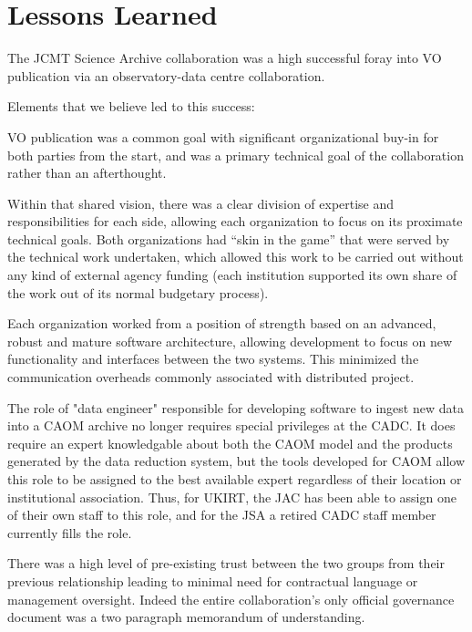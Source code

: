 \documentclass[final,authoryear,5p,times,twocolumn]{elsarticle}
\begin{document}
\section{Lessons Learned}

The JCMT Science Archive collaboration was a high successful foray
into VO publication via an observatory-data centre collaboration.

Elements that we believe led to this success:

\begin{itemize}
\item VO publication was a common goal with significant organizational
  buy-in for both parties from the start, and was a primary technical
  goal of the collaboration rather than an afterthought.

\item Within that shared vision, there was a clear division of
  expertise and responsibilities for each side, allowing each
  organization to focus on its proximate technical goals. Both
  organizations had ``skin in the game'' that were served by the
  technical work undertaken, which allowed this work to be carried out
  without any kind of external agency funding (each institution
  supported its own share of the work out of its normal budgetary
  process).

\item Each organization worked from a position of strength based on an
  advanced, robust and mature software architecture, allowing
  development to focus on new functionality and interfaces between the
  two systems. This minimized the communication overheads commonly
  associated with distributed project.

{\color{red}
\item The role of "data engineer" responsible for developing software to
ingest new data into a CAOM archive no longer requires special privileges
at the CADC.  It does require an expert
knowledgable about both the CAOM model and the products generated
by the data reduction system, but the tools developed for CAOM
allow this role to be assigned to the best available expert regardless of their
location or institutional association.  Thus, for UKIRT, the JAC has been able to
assign one of their own staff to this role, and for the JSA a retired CADC staff
member currently fills the role.
}

\item There was a high level of pre-existing trust between the two
  groups from their previous relationship leading to minimal need for
  contractual language or management oversight. Indeed the entire
  collaboration's only official governance document was a two paragraph
  memorandum of understanding.
\end{itemize}
\end{document}
